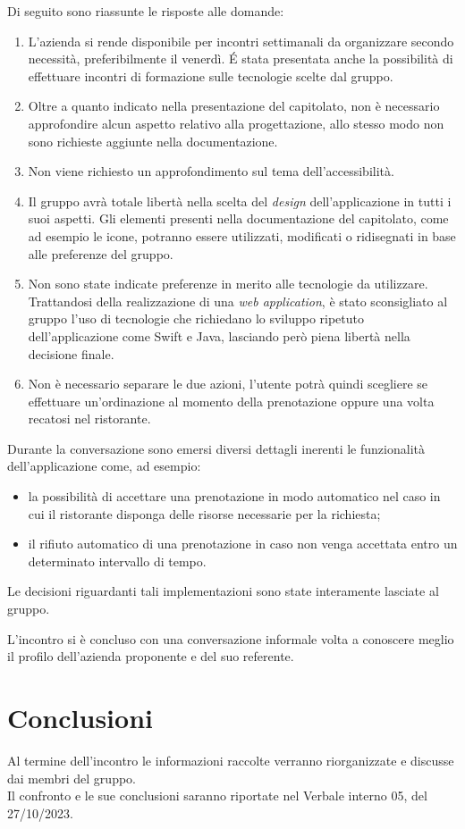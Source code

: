 \noindent
Di seguito sono riassunte le risposte alle domande:
\begin{enumerate}
	\item L'azienda si rende disponibile per incontri settimanali da organizzare
		secondo necessità, preferibilmente il venerdì. \'E stata presentata anche la possibilità di effettuare incontri di formazione sulle tecnologie scelte dal gruppo.
	\item Oltre a quanto indicato nella presentazione del capitolato, non è necessario approfondire alcun aspetto relativo alla progettazione, allo stesso modo non sono richieste aggiunte nella documentazione.
	\item Non viene richiesto un approfondimento sul tema dell'accessibilità.
	\item Il gruppo avrà totale libertà nella scelta del \textit{design} dell'applicazione in tutti i suoi aspetti. Gli elementi presenti nella documentazione del capitolato, come ad esempio le icone, potranno essere utilizzati, modificati o ridisegnati in base alle preferenze del gruppo.
	\item Non sono state indicate preferenze in merito alle tecnologie da utilizzare. Trattandosi della realizzazione di una \textit{web application}, è stato sconsigliato al gruppo l'uso di tecnologie che richiedano lo sviluppo ripetuto dell'applicazione come Swift e Java, lasciando però piena libertà nella decisione finale.
	\item Non è necessario separare le due azioni, l'utente potrà quindi scegliere se effettuare un'ordinazione al momento della prenotazione oppure una volta recatosi nel ristorante. 
\end{enumerate}
Durante la conversazione sono emersi diversi dettagli inerenti le funzionalità dell'applicazione come, ad esempio:
\begin{itemize}
	\item la possibilità di accettare una prenotazione in modo automatico nel caso in cui il ristorante disponga delle risorse necessarie per la richiesta;
	\item il rifiuto automatico di una prenotazione in caso non venga accettata entro un determinato intervallo di tempo.
\end{itemize} 
Le decisioni riguardanti tali implementazioni sono state interamente lasciate al gruppo.

\noindent
L'incontro si è concluso con una conversazione informale volta a conoscere meglio il profilo dell'azienda proponente e del suo referente.


\section{Conclusioni}
Al termine dell'incontro le informazioni raccolte verranno riorganizzate e discusse dai membri del gruppo. \\
Il confronto e le sue conclusioni saranno riportate nel Verbale interno 05, del 27/10/2023.


